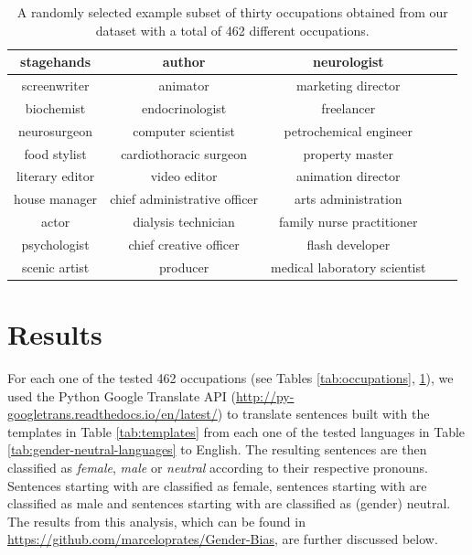 \documentclass{article}
\begin{document}
\begin{table}[H]
	\centering
	\begin{tabular}{|c|c|c|c|c|}
	\hline
	stagehands & author & neurologist \\ \hline
	screenwriter & animator & marketing director \\ \hline
	biochemist & endocrinologist & freelancer \\ \hline
	neurosurgeon & computer scientist & petrochemical engineer \\ \hline
	food stylist & cardiothoracic surgeon & property master \\ \hline
	literary editor & video editor & animation director \\ \hline
	house manager & chief administrative officer & arts administration \\ \hline
	actor & dialysis technician & family nurse practitioner \\ \hline
	psychologist & chief creative officer & flash developer \\ \hline
	scenic artist & producer & medical laboratory scientist \\ \hline
	\end{tabular}
	\caption{A randomly selected example subset of thirty occupations obtained from our dataset with a total of 462 different occupations.}
	\label{tab:occupations-examples}
\end{table}

\section{Results}

For each one of the tested 462 occupations (see Tables \ref{tab:occupations}, \ref{tab:occupations-examples}), we used the Python Google Translate API (\url{http://py-googletrans.readthedocs.io/en/latest/}) to translate sentences built with the templates in Table \ref{tab:templates} from each one of the tested languages in Table \ref{tab:gender-neutral-languages} to English. The resulting sentences are then classified as \emph{female}, \emph{male} or \emph{neutral} according to their respective pronouns. Sentences starting with  are classified as female, sentences starting with  are classified as male and sentences starting with  are classified as (gender) neutral. The results from this analysis, which can be found in \url{https://github.com/marceloprates/Gender-Bias}, are further discussed below.
\end{document}
